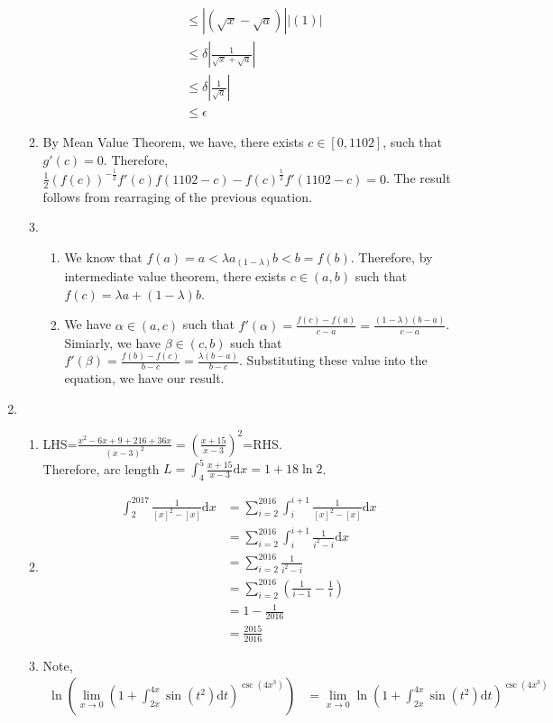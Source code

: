 \documentclass[12pt]{article}
\newcommand{\diff}{\mathrm{d}}
\theoremstyle{definition}
\begin{document}
\begin{enumerate}
\begin{enumerate}
\begin{align*}
    &\leq |(\sqrt{x}-\sqrt{a})||(1)|\\
    &\leq\delta|\frac{1}{\sqrt{x}+\sqrt{a}}|\\
    &\leq \delta |\frac{1}{\sqrt{a}}|\\
    &\leq \epsilon
    \end{align*}
    \item By Mean Value Theorem, we have, there exists $c\in[0,1102]$, such that $g'(c)=0$. Therefore, $\frac{1}{2}(f(c))^{-\frac{1}{2}}f'(c)f(1102-c)-f(c)^\frac{1}{2}f'(1102-c)=0$. The result follows from rearraging of the previous equation.
    \item\begin{enumerate}
      \item We know that $f(a)=a<\lambda a_(1-\lambda) b<b=f(b)$. Therefore, by intermediate value theorem, there exists $c\in(a,b)$ such that $f(c)=\lambda a+(1-\lambda)b$.
      \item We have $\alpha\in(a,c)$ such that $f'(\alpha)=\frac{f(c)-f(a)}{c-a}=\frac{(1-\lambda)(b-a)}{c-a}$. Simiarly, we have $\beta\in(c,b)$ such that $f'(\beta)=\frac{f(b)-f(c)}{b-c}=\frac{\lambda(b-a)}{b-c}$. Substituting these value into the equation, we have our result.
    \end{enumerate}
  \end{enumerate}
  \item\begin{enumerate}
    \item LHS=$\frac{x^2-6x+9+216+36x}{(x-3)^2}=\left(\frac{x+15}{x-3}\right)^2$=RHS.\\Therefore, arc length $L=\int_4^5 \frac{x+15}{x-3}\diff x =1+18\ln2$.
    \item 
    \begin{align*}
    \int_2^{2017}\frac{1}{[x]^2-[x]}\diff x &=\sum_{i=2}^{2016}\int_i^{i+1}\frac{1}{[x]^2-[x]}\diff x\\
    &=\sum_{i=2}^{2016}\int_i^{i+1}\frac{1}{i^2-i}\diff x\\
    &=\sum_{i=2}^{2016} \frac{1}{i^2-i}\\
    &=\sum_{i=2}^{2016} \left(\frac{1}{i-1}-\frac{1}{i}\right)\\
    &=1-\frac{1}{2016}\\
    &=\frac{2015}{2016}
    \end{align*}
    \item Note,
    \begin{align*}
    \ln (\lim_{x\to 0}(1+\int_{2x}^{4x}\sin(t^2)\diff t)^{\csc(4x^3)})&=\lim_{x\to 0}\ln(1+\int_{2x}^{4x}\sin(t^2)\diff t)^{\csc(4x^3)}\\ 

\end{align*}
\end{enumerate}
\end{enumerate}
\end{document}
